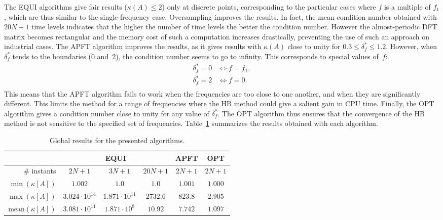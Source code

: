 The EQUI algorithms give fair results ($\kappa(A) \leq 2$) only at
discrete points, corresponding to the particular cases where $f$ is a
multiple of $f_1$, which are thus similar to the single-frequency
case. Oversampling improves the results. In fact, the mean condition number obtained
with $20N + 1$ time levels indicates that the higher the number of time levels
the better the condition number. However the almost-periodic DFT
matrix becomes rectangular and the memory cost of such a computation
increases drastically, preventing the use of such an approach on industrial cases. The APFT
algorithm improves the results, as it gives results with $\kappa ( A
)$ close to unity for $0.3 \leq \delta_f^* \leq 1.2$. However, when
$\delta_f^*$ tends to the boundaries (0 and~2), the condition
number seems to go to infinity. This corresponds to special values
of~$f$:
\begin{equation}
  \begin{split}
    \delta_f^* = 0 & \iff f = f_1, \\
    \delta_f^* = 2 & \iff f = 0. \\
  \end{split}
  \label{eq:singularities}
\end{equation}
This means that the APFT algorithm fails to work when the frequencies
are too close to one another, and when they are significantly
different.  This limits the method for a range of frequencies where
the HB method could give a salient gain in CPU time. %
Finally, the OPT algorithm gives a condition number close to unity for
any value of $\delta_f^*$. The OPT algorithm thus ensures that the
convergence of the HB method is not sensitive to the specified set of
frequencies. Table~\ref{tab:algo_sum} summarizes the results obtained
with each algorithm.
\begin{table}[htb]
  \centering
  \begin{tabular}{|r|*{5}{c|}}
    \hline
    & \multicolumn{3}{c|}{EQUI} & APFT & OPT\\
    \hline
    \# instants & $2N+1$ & $3N+1$ & $20N+1$ & $2N+1$ & $2N+1$ \\
    \hline
    \hline
    $\min \left( \kappa \left[A\right]\right) $ & $1.002$ & $1.0$ & $1.0$ & $1.001$ & $1.000$ \\
    \hline
    $\max \left( \kappa \left[A\right]\right) $ & $3.024\cdot 10^{14}$ & $1.871\cdot 10^{11}$ & $2732.6$ & $823.8$ & $2.905$ \\
    \hline
    $\textrm{mean} \left( \kappa \left[A\right]\right) $ & $3.081\cdot 10^{11}$ & $1.871\cdot 10^{8}$ & $10.92$ & $7.742$ & $1.097$ \\
    \hline
  \end{tabular}
\caption{Global results for the presented algorithms.}
\label{tab:algo_sum}
\end{table} 

